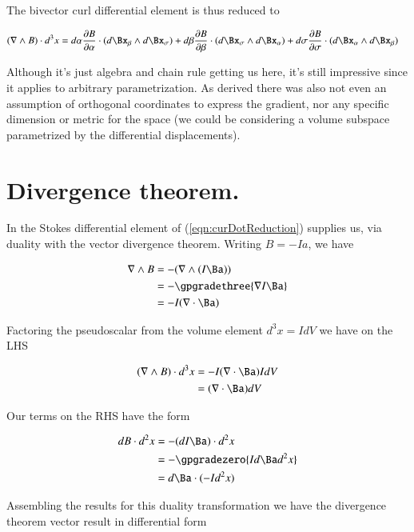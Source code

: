 The bivector curl differential element is thus reduced to

\begin{align}\label{eqn:curDotReduction}
(\grad \wedge B) \cdot d^3 x
&=
 d\alpha \PD{\alpha}{B} \cdot (d\Bx_\beta \wedge d\Bx_\sigma)
+d\beta \PD{\beta}{B} \cdot (d\Bx_\sigma \wedge d\Bx_\alpha)
+d\sigma \PD{\sigma}{B} \cdot (d\Bx_\alpha \wedge d\Bx_\beta)
\end{align}

Although it's just algebra and chain rule getting us here, it's still impressive since it applies to arbitrary parametrization.  As derived there was also not even an assumption of orthogonal coordinates to express the gradient, nor any specific dimension or metric for the space (we could be considering a volume subspace parametrized by the differential displacements).

\section{Divergence theorem.}

In  the Stokes differential element of (\ref{eqn:curDotReduction}) supplies us, via duality with the vector divergence theorem.  Writing $B = -I a$, we have

\begin{align*}
\grad \wedge B
&= -(\grad \wedge (I\Ba)) \\
&= - \gpgradethree{ \grad I\Ba } \\
&= - I (\grad \cdot \Ba )
\end{align*}

Factoring the pseudoscalar from the volume element $d^3 x = I dV$ we have on the LHS

\begin{align*}
(\grad \wedge B) \cdot d^3 x
&= - I (\grad \cdot \Ba ) I dV \\
&= (\grad \cdot \Ba ) dV \\
\end{align*}

Our terms on the RHS have the form

\begin{align*}
d B \cdot d^2 x
&=
-(d I \Ba) \cdot d^2 x \\
&=
- \gpgradezero{ I d \Ba d^2 x } \\
&=
d \Ba \cdot (-I d^2 x)
\end{align*}

Assembling the results for this duality transformation we have the divergence theorem vector result in differential form

